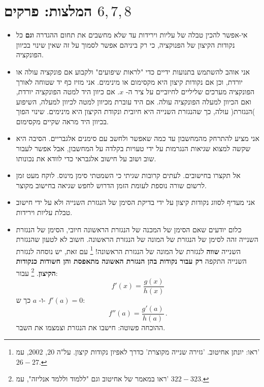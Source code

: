 

\section*{המלצות: פרקים 
$6,7,8$}


\begin{itemize}
\item
אי-אפשר להכין טבלה של עליות וירידות עד שלא מחשבים את תחום ההגדרה 
\textbf{וגם}
כל נקודות הקיצון של הפנוקציה, כי רק ביניהם אפשר לסמוך על זה שאין שינוי בכיוון הפונקציה.


\item
אני אוהב להשתמש בתנועות ידיים כדי "לראות שיפועים" ולקבוע אם פונקציה עולה או יורדת, וכן אם נקודות קיצון היא מקסימום או מינימים. אני מזיז כף יד שטוחה לאורך הפונקציה מערכים שליליים לחיוביים על ציר ה-%
$x$.
אם כיוון היד למטה הפונקציה יורדת, ואם הכיוון למעלה הפונקציה עולה. אם היד עוברת מכיוון למטה לכיוון למעלה, השיפוע )הנגזרת( עולה, כך שהנגזרת השנייה היא חיובית ונקודת הקיצון היא מינימים. שינוי הפוך בכיוון היד מראה שקיים מקסימום.

\item
אני מציע להתרחק מהמחשבון עד כמה שאפשר ולחשב עם סימנים אלגבריים. הסיבה היא שקשה למצוא שגיאות הנגרמות על ידי טעויות בקלדה על המחשבון, אבל אפשר לעבור שוב ושוב על חישוב אלגבראי כדי לוודא את נכונותו. 

\item
אל תקצרו בחישובים. לעתים קרובות שגיתי כי השמטתי סימן מינוס. לוקח מעט זמן לרשום שורה נוספת לעומת הזמן הדרוש לחפש שגיאה בחישוב מקוצר.

\item
אני מעדיף לסווג נקודות קיצון על ידי בדיקת הסימן של הנגזרת השנייה ולא על ידי חישוב טבלת עליות וירידות. 

\item
כלום יודעים שאם הסימן של המכנה של הנגזרת הראשונה חיובי, הסימן של הנגזרת השנייה זהה לסימן של הנגזרת של המונה של הנגזרת הראשונה. חשוב לא לטעון שהנגזרת השנייה
\textbf{שווה}
לנגזרת של המונה של הנגזרת הראשונה!%
\footnote{%
ראו: יונתן אחיטוב. 'גזירה שנייה מקוצרת' כדרך לאפיון נקודות קיצון. על"ה 
$20$,
$2002$,
עמ'
$26\!-\!27$.%
}
עם זאת, יש נוסחה לנגזרת השנייה התקפה 
\textbf{רק עבור נקודות בהן הנגזרת האשונה מתאפסת והן חשודות כנקודות הקיצון}.%
\footnote{%
ראו במאמר של אחיטוב וגם "ללמוד וללמד אנליזה", עמ'
$322-323$.%
}
עבור:
\[
f'(x)=\frac{g(x)}{h(x)}
\]
ו-%
$a$
כך ש-%
$f'(a)=0$:
\[
f''(a) = \frac{g'(a)}{h(a)}\,.
\]
ההוכחה פשוטה: חישבו את הנגזרת וצמצמו את השבר.


\end{itemize}
